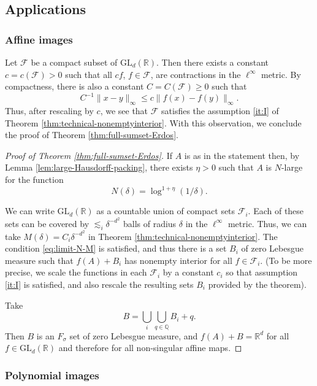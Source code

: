 \documentclass[12pt]{amsart}
\def\R{{\mathbb{R}}}
\numberwithin{theorem}{section}
\numberwithin{equation}{section}
\begin{document}
\subsection{Applications}

\subsubsection{Affine images}

Let $\mathcal{F}$ be a compact subset of $\text{GL}_d(\R)$. Then there exists a constant $c=c(\mathcal{F})>0$ such that all $cf$, $f\in\mathcal{F}$, are contractions in the $\ell^\infty$ metric. By compactness, there is also a constant $C=C(\mathcal{F})\ge 0$ such that
\[
    C^{-1} \|x-y\|_{\infty} \le c\|f(x)-f(y)\|_{\infty} .
\]
Thus, after rescaling by $c$, we see that $\mathcal{F}$ satisfies the assumption \ref{it:I} of Theorem \ref{thm:technical-nonemptyinterior}. With this observation, we conclude the proof of Theorem \ref{thm:full-sumset-Erdos}.

\begin{proof}[Proof of Theorem \ref{thm:full-sumset-Erdos}]
    If $A$ is as in the statement then, by Lemma \ref{lem:large-Hausdorff-packing}, there exists $\eta>0$ such that $A$ is $N$-large for the function
    \[
        N(\delta) = \log^{1+\eta}(1/\delta).
    \]

    We can write $\text{GL}_d(\R)$ as a countable union of compact sets $\mathcal{F}_i$. Each of these sets can be covered by $\lesssim_i \delta^{-d^2}$ balls of radius $\delta$ in the $\ell^\infty$ metric. Thus, we can take $M(\delta)=C_i\delta^{-d^2}$ in Theorem \ref{thm:technical-nonemptyinterior}. The condition \eqref{eq:limit-N-M} is satisfied, and thus there is a set $B_i$ of zero Lebesgue measure such that $f(A)+B_i$ has nonempty interior for all $f\in\mathcal{F}_i$. (To be more precise, we scale the functions in each $\mathcal{F}_i$ by a constant $c_i$ so that assumption \ref{it:I} is satisfied, and also rescale the resulting sets $B_i$ provided by the theorem).

    Take
    \[
        B = \bigcup_i \bigcup_{q\in\mathbb{Q}} B_i + q.
    \]
    Then $B$ is an $F_\sigma$ set of zero Lebesgue measure, and $f(A)+B=\R^d$ for all $f\in\text{GL}_d(\R)$ and therefore for all non-singular affine maps.
\end{proof}

\subsubsection{Polynomial images}
\end{document}
